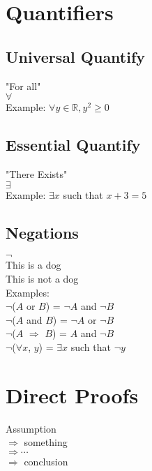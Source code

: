 \documentclass[11pt]{article}
\theoremstyle{remark}
\begin{document}
	\section{Quantifiers}

	\subsection{Universal Quantify}
	\begin{center}
		"For all"\\
		$\forall$\\
		Example: $\forall y \in \mathbb{R}, y^2 \geqslant 0$\\
	\end{center}
	\subsection{Essential Quantify}
	\begin{center}
		"There Exists"\\
		$\exists$\\
		Example: $\exists x$ such that $x + 3 = 5$\\
	\end{center}
	\subsection{Negations}
	\begin{center}
		$\neg$ \\ 
		This is a dog\\
		This is not a dog\\
		Examples: \\
		$\neg$($A$ or $B$) = $\neg A$ and $\neg B$ \\
		$\neg$($A$ and $B$) = $\neg A$ or $\neg B$ \\
		$\neg$($A$ $\Rightarrow$ $B$) = $A$ and $\neg B$ \\
		$\neg$($\forall x$, $y$) = $\exists x$ such that $\neg y$ \\

	\end{center}


	\section{Direct Proofs}
	\begin{center}
		Assumption\\ 
		$\Rightarrow$ something \\ 
		$\Rightarrow \cdots$ \\
		$\Rightarrow$ conclusion \\
	\end{center}
\end{document}
